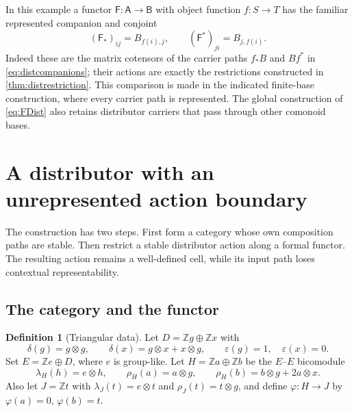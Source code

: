 \documentclass[11pt,reqno]{amsart}
\theoremstyle{plain}
\theoremstyle{definition}
\newtheorem{definition}[theorem]{Definition}
\theoremstyle{remark}
\numberwithin{equation}{section}
\newcommand{\Z}{\mathbb Z}
\newcommand{\eps}{\varepsilon}
\begin{document}
In this example a functor $\mathsf F:\mathsf A\to\mathsf B$ with
object function $f:S\to T$ has the familiar represented companion and
conjoint
\[
 (\mathsf F_*)_{ij}=B_{f(i),j},\qquad
 (\mathsf F^*)_{ji}=B_{j,f(i)}.
\]
Indeed these are the matrix cotensors of the carrier paths $f_*B$ and
$Bf^*$ in \cref{eq:distcompanions}; their actions are exactly the
restrictions constructed in \cref{thm:distrestriction}. This comparison
is made in the indicated finite-base construction, where every carrier
path is represented. The global construction of \cref{eq:FDist} also
retains distributor carriers that pass through other comonoid bases.

\section{A distributor with an unrepresented action boundary}
\label{sec:unrepresented}

The construction has two steps. First form a category whose own
composition paths are stable. Then restrict a stable distributor action
along a formal functor. The resulting action remains a well-defined
cell, while its input path loses contextual representability.

\subsection{The category and the functor}

\begin{definition}[Triangular data]\label{strong:def:triangular-data}
Let $D=\Z g\oplus\Z x$ with
\[
\delta(g)=g\otimes g,\qquad
\delta(x)=g\otimes x+x\otimes g,\qquad
\eps(g)=1,\quad\eps(x)=0.
\]
Set $E=\Z e\oplus D$, where $e$ is group-like. Let
$H=\Z a\oplus\Z b$ be the $E$--$E$ bicomodule
\begin{equation}\label{strong:eq:H}
\lambda_H(h)=e\otimes h,\qquad
\rho_H(a)=a\otimes g,\qquad
\rho_H(b)=b\otimes g+2a\otimes x.
\end{equation}
Also let $J=\Z t$ with $\lambda_J(t)=e\otimes t$ and
$\rho_J(t)=t\otimes g$, and define $\varphi:H\to J$ by
$\varphi(a)=0$, $\varphi(b)=t$.
\end{definition}
\end{document}
